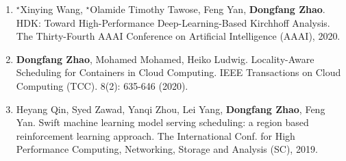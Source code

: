 \documentclass[11pt]{scrartcl}
\begin{document}
\begin{enumerate}
\item $^\star$Xinying Wang, $^\star$Olamide Timothy Tawose, Feng Yan, \textbf{Dongfang Zhao}.
HDK: Toward High-Performance Deep-Learning-Based Kirchhoff Analysis. The Thirty-Fourth AAAI Conference on Artificial Intelligence (AAAI), 2020. 




\item \textbf{Dongfang Zhao}, Mohamed Mohamed, Heiko Ludwig.
Locality-Aware Scheduling for Containers in Cloud Computing. IEEE Transactions on Cloud Computing (TCC). 8(2): 635-646 (2020).



\item Heyang Qin, Syed Zawad, Yanqi Zhou, Lei Yang, \textbf{Dongfang Zhao}, Feng Yan.
Swift machine learning model serving scheduling: a region based reinforcement learning approach.
The International Conf. for High Performance Computing, Networking, Storage and Analysis (SC), 2019.



\end{enumerate}
\end{document}
